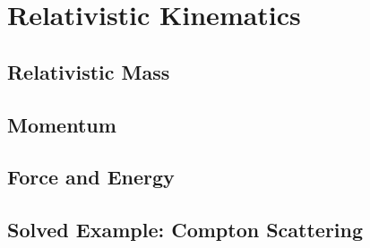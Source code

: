 
\section{Relativistic Kinematics}

\subsection{Relativistic Mass}

\subsection{Momentum}

\subsection{Force and Energy}

\subsection{Solved Example: Compton Scattering}